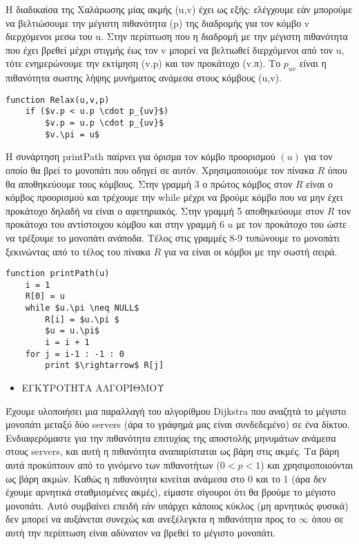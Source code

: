 \documentclass[a4paper,11pt]{article}
\begin{document}
Η διαδικαίσα της Χαλάρωσης μίας ακμής (u,v) έχει ως εξής: ελέγχουμε εάν μπορούμε να βελτιώσουμε την μέγιστη πιθανότητα (p) της διαδρομής για τον κόμβο v διερχόμενοι μεσω του u. Στην περίπτωση που η διαδρομή με την μέγιστη πιθανότητα που έχει βρεθεί μέχρι στιγμής έως τον v μπορεί να βελτιωθεί διερχόμενοι από τον u, τότε ενημερώνουμε την εκτίμηση (v.p) και τον προκάτοχο (v.π). Το $p_{uv}$ είναι η πιθανότητα σωστης λήψης μυνήματος ανάμεσα στους κόμβους (u,v).

\begin{lstlisting}[mathescape]
function Relax(u,v,p)
    if ($v.p < u.p \cdot p_{uv}$)
        $v.p = u.p \cdot p_{uv}$
        $v.\pi = u$
\end{lstlisting}

\newpage

Η συνάρτηση printPath παίρνει για όρισμα τον κόμβο προορισμού $(u)$ για τον οποίο θα βρεί το μονοπάτι που οδηγεί σε αυτόν. Χρησιμοποιούμε τον πίνακα $R$ όπου θα αποθηκεύουμε τους κόμβους. Στην γραμμή 3 ο πρώτος κόμβος στον $R$ είναι ο κόμβος προορισμού και τρέχουμε την while μέχρι να βρούμε κόμβο που να μην έχει προκάτοχο δηλαδή να είναι ο αφετηριακός. Στην γραμμή 5 αποθηκεύουμε στον $R$ τον προκάτοχο του αντίστοιχου κόμβου και στην γραμμή 6 $u$ με τον προκάτοχο του ώστε να τρέξουμε το μονοπάτι ανάποδα. Τέλος στις γραμμές 8-9 τυπώνουμε το μονοπάτι ξεκινώντας από το τέλος του πίνακα $R$ για να είναι οι κόμβοι με την σωστή σειρά.

\begin{lstlisting}[mathescape]
function printPath(u)
    i = 1
    R[0] = u
    while $u.\pi \neq NULL$
        R[i] = $u.\pi $
        $u = u.\pi$
        i = i + 1 
    for j = i-1 : -1 : 0
        print $\rightarrow$ R[j]
\end{lstlisting}

\begin{itemize}
\item ΕΓΚΥΡΟΤΗΤΑ ΑΛΓΟΡΙΘΜΟΥ
\end{itemize}

Έχουμε υλοποιήσει μια παραλλαγή του αλγορίθμου Dijkstra που αναζητά το μέγιστο μονοπάτι μεταξύ δύο servers (άρα το γράφημά μας είναι συνδεδεμένο) σε ένα δίκτυο. Ενδιαφερόμαστε για την πιθανότητα επιτυχίας της αποστολής μηνυμάτων ανάμεσα στους servers, και αυτή η πιθανότητα αναπαρίσταται ως βάρη στις ακμές. Τα βάρη αυτά προκύπτουν από το γινόμενο των πιθανοτήτων ($0<p<1$) και χρησιμοποιούνται ως βάρη ακμών.
Καθώς η πιθανότητα  κινείται  ανάμεσα στο 0 και το 1 (άρα δεν έχουμε αρνητικά σταθμισμένες ακμές), είμαστε σίγουροι ότι θα βρούμε το μέγιστο μονοπάτι. Αυτό συμβαίνει επειδή εάν υπάρχει κάποιος  κύκλος (μη αρνητικός φυσικά) δεν μπορεί να αυξάνεται συνεχώς και ανεξέλεγκτα η πιθανότητα προς το $\infty$  όπου σε αυτή την περίπτωση είναι αδύνατον να βρεθεί το μέγιστο μονοπάτι.
 
\end{document}
